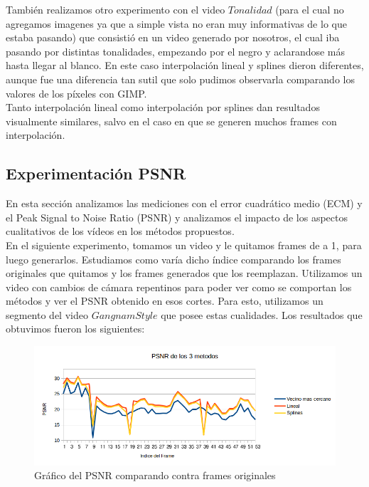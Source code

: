 También realizamos otro experimento con el video $Tonalidad$ (para el cual no agregamos imagenes ya que a simple vista no eran muy informativas de lo que estaba pasando) que consistió en un video generado por nosotros, el cual iba pasando por distintas tonalidades, empezando por el negro y aclarandose más hasta llegar al blanco. En este caso interpolación lineal y splines dieron diferentes, aunque fue una diferencia tan sutil que solo pudimos observarla comparando los valores de los píxeles con GIMP.\\

Tanto interpolación lineal como interpolación por splines dan resultados visualmente similares, salvo en el caso en que se generen muchos frames con interpolación.

\newpage
\subsection{Experimentación PSNR}

En esta sección analizamos las mediciones con el error cuadrático medio (ECM) y el Peak Signal to Noise Ratio (PSNR) y analizamos el impacto de los aspectos cualitativos de los vídeos en los métodos propuestos. \\

En el siguiente experimento, tomamos un video y le quitamos frames de a 1, para luego generarlos. Estudiamos como varía dicho índice comparando los frames originales que quitamos y los frames generados que los reemplazan. Utilizamos un video con cambios de cámara repentinos para poder ver como se comportan los métodos y ver el PSNR obtenido en esos cortes. Para esto, utilizamos un segmento del video $Gangnam Style$ que posee estas cualidades.
Los resultados que obtuvimos fueron los siguientes:


\begin{figure}[h!]
  \caption{Gráfico del PSNR comparando contra frames originales}
  \centering
    \includegraphics[scale=0.5]{imagenes/PSNRGangnam.png}
\end{figure}

